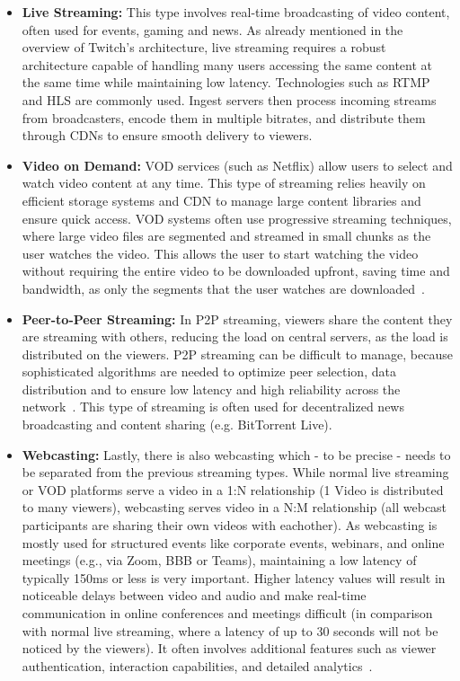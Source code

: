 \begin{itemize}
    \item \textbf{Live Streaming:} This type involves real-time broadcasting of video content, often used for events, gaming and news. As already mentioned in the overview of Twitch's architecture, live streaming requires a robust architecture capable of handling many users accessing the same content at the same time while maintaining low latency. Technologies such as \ac{RTMP} and \ac{HLS} are commonly used. Ingest servers then process incoming streams from broadcasters, encode them in multiple bitrates, and distribute them through \ac{CDN}s to ensure smooth delivery to viewers.
    \item \textbf{Video on Demand:} \ac{VOD} services (such as Netflix) allow users to select and watch video content at any time. This type of streaming relies heavily on efficient storage systems and \ac{CDN} to manage large content libraries and ensure quick access. \ac{VOD} systems often use progressive streaming techniques, where large video files are segmented and streamed in small chunks as the user watches the video. This allows the user to start watching the video without requiring the entire video to be downloaded upfront, saving time and bandwidth, as only the segments that the user watches are downloaded~\parencite{cloud_streaming_trends}.
    \item \textbf{Peer-to-Peer Streaming:} In \ac{P2P} streaming, viewers share the content they are streaming with others, reducing the load on central servers, as the load is distributed on the viewers. \ac{P2P} streaming can be difficult to manage, because sophisticated algorithms are needed to optimize peer selection, data distribution and to ensure low latency and high reliability across the network~\parencite{p2p}. This type of streaming is often used for decentralized news broadcasting and content sharing (e.g. BitTorrent Live).
    \item \textbf{Webcasting:} Lastly, there is also webcasting which - to be precise - needs to be separated from the previous streaming types. While normal live streaming or \ac{VOD} platforms serve a video in a 1:N relationship (1 Video is distributed to many viewers), webcasting serves video in a N:M relationship (all webcast participants are sharing their own videos with eachother). As webcasting is mostly used for structured events like corporate events, webinars, and online meetings (e.g., via Zoom, BBB or Teams), maintaining a low latency of typically 150ms or less is very important. Higher latency values will result in noticeable delays between video and audio and make real-time communication in online conferences and meetings difficult (in comparison with normal live streaming, where a latency of up to 30 seconds will not be noticed by the viewers).  
    It often involves additional features such as viewer authentication, interaction capabilities, and detailed analytics~\parencite{cloud_streaming_trends}.
\end{itemize}

